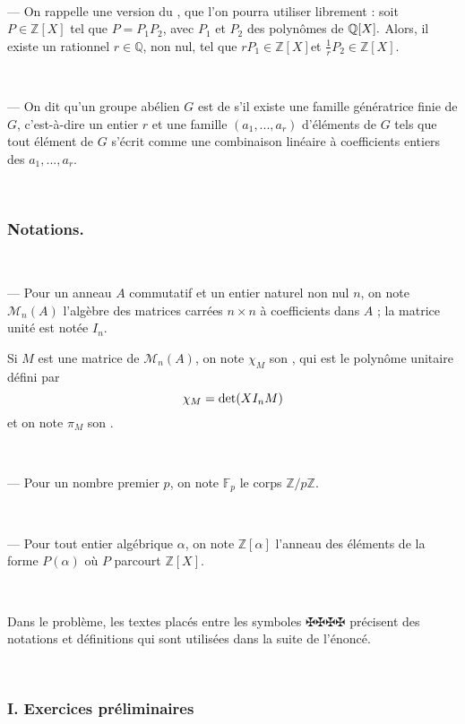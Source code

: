 \

--- On rappelle une version du , que l'on pourra
utiliser librement : soit $P \in \mathbb{Z}[X]$ tel que $P = P_1 P_2$, avec
$P_1$ et $P_2$ des polyn{\^o}mes de $\mathbb{Q} [\nobracket X] .$ Alors, il
existe un rationnel $r \in \mathbb{Q}$, non nul, tel que $r P_1 \in
\mathbb{Z}[X]$et $\frac{1}{r} P_2 \in \mathbb{Z}[X]$.

\

--- On dit qu'un groupe ab{\'e}lien $G$ est de  s'il
existe une famille g{\'e}n{\'e}ratrice finie de $G$, c'est-{\`a}-dire un
entier $r$ et une famille $(a_1, . . ., a_r)$ d'{\'e}l{\'e}ments de $G$ tels
que tout {\'e}l{\'e}ment de $G$ s'{\'e}crit comme une combinaison lin{\'e}aire
{\`a} coefficients entiers des $a_1, . . ., a_r$.

\

\subsubsection*{Notations.}

\

--- Pour un anneau $A$ commutatif et un entier naturel non nul $n$, on note
$\mathcal{M}_n (A)$ l'alg{\`e}bre des matrices carr{\'e}es $n \times n$ {\`a}
coefficients dans $A$ ; la matrice unit{\'e} est not{\'e}e $I_n$.

Si $M$ est une matrice de $\mathcal{M}_n (A)$, on note $\chi_M$ son
, qui est le polyn{\^o}me unitaire
d{\'e}fini par
\[ \chi_M = \det (X I_n \nonconverted{minus} M) \]
et on note $\pi_M$ son .

\

--- Pour un nombre premier $p$, on note $\mathbb{F}_p$ le corps $\mathbb{Z}/
p\mathbb{Z}.$

\

--- Pour tout entier alg{\'e}brique $\alpha$, on note $\mathbb{Z}[\alpha]$
l'anneau des {\'e}l{\'e}ments de la forme $P (\alpha)$ o{\`u} $P$ parcourt
$\mathbb{Z}[X]$.

\

Dans le probl{\`e}me, les textes plac{\'e}s entre les symboles $\maltese
\maltese${\textdots}$\maltese \maltese$ pr{\'e}cisent des notations et
d{\'e}finitions qui sont utilis{\'e}es dans la suite de l'{\'e}nonc{\'e}.

\

\subsubsection*{I. Exercices pr{\'e}liminaires}

